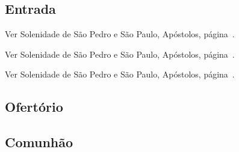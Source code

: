 
\subsection{Entrada}\label{subsection:communia/commune-apostolorum/psalmi-ad-introitum}

\begin{rubrica}
  Ver Solenidade de São Pedro e São Paulo, Apóstolos, página~\pageref{subsection:proprium-sanctorum/sanctorum-petri-et-pauli-apostolorum/psalmus-responsorius}.
\end{rubrica}
\vspace{-2mm}

\begin{rubrica}
  Ver Solenidade de São Pedro e São Paulo, Apóstolos, página~\pageref{subsection:proprium-sanctorum/sanctorum-petri-et-pauli-apostolorum/alleluia}.
\end{rubrica}
\vspace{-2mm}

\begin{rubrica}
  Ver Solenidade de São Pedro e São Paulo, Apóstolos, página~\pageref{subsection:proprium-sanctorum/sanctorum-petri-et-pauli-apostolorum/psalmus-alleluiaticus}.
\end{rubrica}
\vspace{-2mm}

\subsection{Ofertório}\label{subsection:communia/commune-apostolorum/psalmi-ad-offertorium}

\AllowPageBreak

\subsection{Comunhão}\label{subsection:communia/commune-apostolorum/psalmi-ad-communionem}
